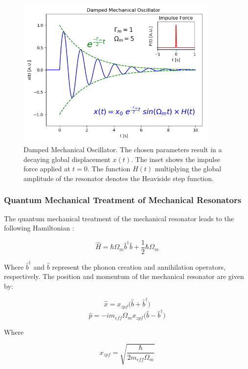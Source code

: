 \documentclass[%
 reprint,
nofootinbib,
 amsmath,amssymb,
 aps,
]{revtex4-2}
\begin{document}
\begin{figure}[htb]
    \centering
    \includegraphics [width=\columnwidth, height=7.5cm] {damped_mechanical_oscillator.png}
    \caption{Damped Mechanical Oscillator. The chosen parameters result in a decaying global displacement $x(t)$. The inset shows the impulse force applied at $t = 0$. The function $H(t)$ multiplying the global amplitude of the resonator denotes the Heaviside step function. }
    \label{fig:mechanical_oscillator}
\end{figure}

\subsubsection{Quantum Mechanical Treatment of Mechanical Resonators}

The quantum mechanical treatment of the mechanical resonator leads to the following Hamiltonian \cite{cavity_optomechanics_2014}:

\begin{equation} \label{Mechanical Resonator Hamiltonian}
    \hat{H} = \hbar \Omega_{m} \hat{b}^{\dagger}\hat{b} + \frac{1}{2} \hbar \Omega_{m}
\end{equation}

Where $\hat{b}^{\dagger}$ and $\hat{b}$ represent the phonon creation and annihilation operators, respectively. The position and momentum of the mechanical resonator are given by:

\centering
$$ \hat{x} = x_{zpf} \big( {\hat{b} + \hat{b}^{\dagger}} \big)$$ 
$$\hat{p} = -i m_{eff} \Omega_{m} x_{zpf} \big( {\hat{b} - \hat{b}^{\dagger}} \big)$$

\flushleft
Where 

$$ x_{zpf} = \sqrt{\frac{\hbar}{2m_{eff}\Omega_{m}}} $$
\
\end{document}
